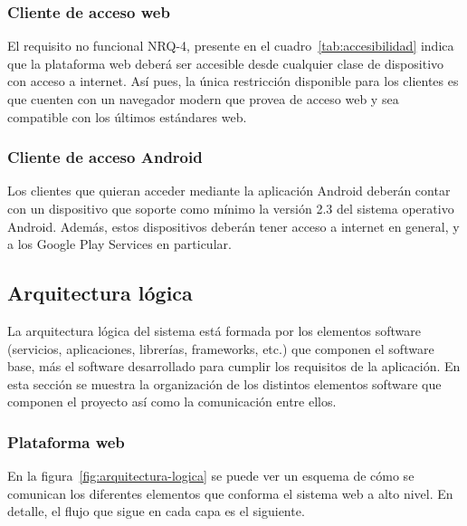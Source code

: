 \subsubsection{Cliente de acceso web}

El requisito no funcional NRQ-4, presente en el cuadro~\ref{tab:accesibilidad}
indica que la plataforma web deberá ser accesible desde cualquier clase de
dispositivo con acceso a internet. Así pues, la única restricción disponible
para los clientes es que cuenten con un navegador modern que provea de acceso
web y sea compatible con los últimos estándares web.

\subsubsection{Cliente de acceso Android}

Los clientes que quieran acceder mediante la aplicación Android deberán contar
con un dispositivo que soporte como mínimo la versión 2.3 del sistema operativo
Android. Además, estos dispositivos deberán tener acceso a internet en general,
y a los Google Play Services en particular.

\subsection{Arquitectura lógica}

La arquitectura lógica del sistema está formada por los elementos software
(servicios, aplicaciones, librerías, frameworks, etc.) que componen el software
base, más el software desarrollado para cumplir los requisitos de la
aplicación. En esta sección se muestra la organización de los distintos
elementos software que componen el proyecto así como la comunicación entre
ellos. 

\subsubsection{Plataforma web}
\label{subsec:arquitectura-logica-web}

En la figura~\ref{fig:arquitectura-logica} se puede ver un esquema de cómo se
comunican los diferentes elementos que conforma el sistema web a alto nivel. En
detalle, el flujo que sigue en cada capa es el siguiente.

